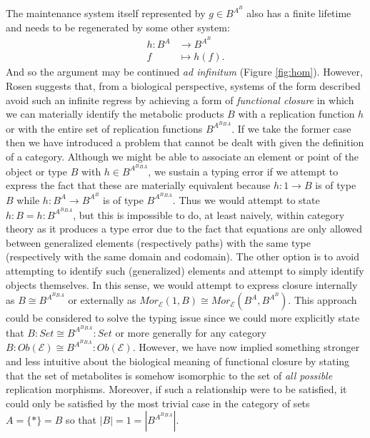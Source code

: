 The maintenance system itself represented by $g \in B^{A^B}$ also has a finite lifetime and needs to be regenerated by some other system:
\begin{align*}
h \colon B^A & \longrightarrow B^{A^B}\\
f & \longmapsto h(f).
\end{align*}	
And so the argument may be continued \emph{ad infinitum} (Figure \ref{fig:hom}). However, Rosen suggests that, from a biological perspective, systems of the form described avoid such an infinite regress by achieving a form of \emph{functional closure} in which we can materially identify the metabolic products $B$ with a replication function $h$ or with the entire set of replication functions $B^{A^B{^B{^A}}}$. If we take the former case then we have introduced a problem that cannot be dealt with given the definition of a category. Although we might be able to associate an element or point of the object or type $B$ with $h \in B^{A^B{^B{^A}}}$, we sustain a typing error if we attempt to express the fact that these are materially equivalent because $h \colon 1 \rightarrow B$ is of type $B$ while $h \colon B^A \rightarrow B^{A^B}$ is of type $B^{A^B{^B{^A}}}$. Thus we would attempt to state $h:B = h:B^{A^B{^B{^A}}}$, but this is impossible to do, at least naively, within category theory as it produces a type error due to the fact that equations are only allowed between generalized elements (respectively paths) with the same type (respectively with the same domain and codomain). The other option is to avoid attempting to identify such (generalized) elements and attempt to simply identify objects themselves. In this sense, we would attempt to express closure internally as $B \cong B^{A^B{^B{^A}}}$ or externally as $Mor_{\mathcal{E}}(1,B) \cong Mor_{\mathcal{E}}(B^A,B^{A^B})$. This approach could be considered to solve the typing issue since we could more explicitly state that $B \colon Set \cong B^{A^B{^B{^A}}} \colon Set$ or more generally for any category $B \colon Ob(\mathcal{E}) \cong B^{A^B{^B{^A}}} \colon Ob(\mathcal{E})$. However, we have now implied something stronger and less intuitive about the biological meaning of functional closure by stating that the set of metabolites is somehow isomorphic to the set of \emph{all possible} replication morphisms. Moreover, if such a relationship were to be satisfied, it could only be satisfied by the most trivial case in the category of sets $A = \{*\} = B$ so that $|B|=1=|B^{A^B{^B{^A}}}|$.

